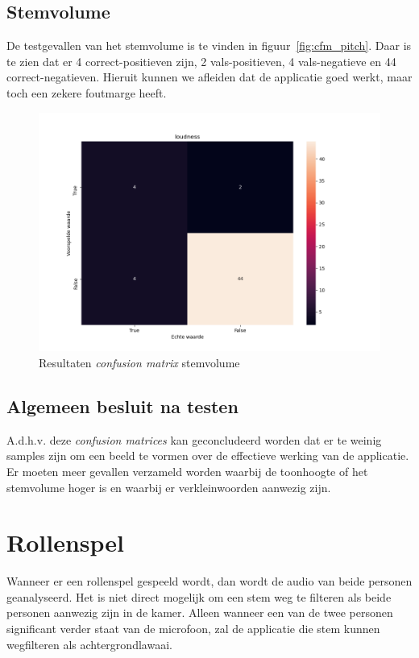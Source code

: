 \subsection{Stemvolume}

De testgevallen van het stemvolume is te vinden in figuur~\ref{fig:cfm_pitch}. Daar is te zien dat er 4 correct-positieven zijn, 2 vals-positieven, 4 vals-negatieve en 44 correct-negatieven.
Hieruit kunnen we afleiden dat de applicatie goed werkt, maar toch een zekere foutmarge heeft.
\begin{figure}
	\centering
	\includegraphics[width=1\textwidth]{./img/cfm_loudness}
	\caption{\label{fig:cfm_loudness} Resultaten \textit{confusion matrix} stemvolume}
\end{figure}

\subsection{Algemeen besluit na testen}
A.d.h.v. deze \textit{confusion matrices} kan geconcludeerd worden dat er te weinig samples zijn om een beeld te vormen over de effectieve werking van de applicatie. Er moeten meer gevallen verzameld worden waarbij de toonhoogte of het stemvolume hoger is en waarbij er verkleinwoorden aanwezig zijn.

\section{Rollenspel}
Wanneer er een rollenspel gespeeld wordt, dan wordt de audio van beide personen geanalyseerd. Het is niet direct mogelijk om een stem weg te filteren als beide personen aanwezig zijn in de kamer. Alleen wanneer een van de twee personen significant verder staat van de microfoon, zal de applicatie die stem kunnen wegfilteren als achtergrondlawaai.

